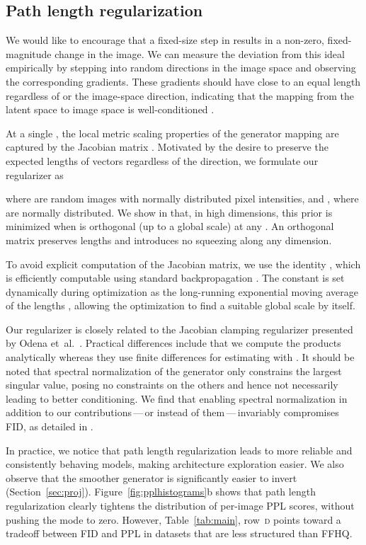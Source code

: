 \documentclass[10pt,twocolumn,letterpaper]{article}
\newcommand{\arch}[1]{\textsc{#1}}
\newcommand{\FINAL}[2][]{#2}
\begin{document}
\subsection{Path length regularization}
\label{sec:pathreg}

 
\FINAL{We would like to encourage that a fixed-size step in  results in a non-zero, fixed-magnitude change in the image. 
We can measure the deviation from this ideal empirically by stepping into random directions in the image space and observing the corresponding  gradients.
These gradients should have close to an equal length regardless of  or the image-space direction, indicating that the mapping from the latent space to image space is well-conditioned \cite{Odena2018}.
}

At a single , the local metric scaling properties of the generator mapping   are captured by the Jacobian matrix . Motivated by the desire to preserve the expected lengths of vectors regardless of the direction, we formulate our regularizer as

where  are random images with normally distributed pixel intensities, and , where  are normally distributed. We show in  that, in high dimensions, this prior is minimized when  is orthogonal (up to a global scale) at any . An orthogonal matrix preserves lengths and introduces no squeezing along any dimension.

To avoid explicit computation of the Jacobian matrix, we use the identity , which is efficiently computable using standard backpropagation \cite{Dauphin2015}. The constant  is set dynamically during optimization as the long-running exponential moving average of the lengths , allowing the optimization to find a suitable global scale by itself.

Our regularizer is closely related to the Jacobian clamping regularizer presented by Odena et~al.~\cite{Odena2018}. Practical differences include that we compute the products  analytically whereas they use finite differences for estimating  with .
It should be noted that spectral normalization \cite{Miyato2018B} of the generator \cite{Zhang2018sagan} only constrains the largest singular value, posing no constraints on the others and hence not necessarily leading to better conditioning.
\FINAL{We find that enabling spectral normalization in addition to our contributions\,---\,or instead of them\,---\,invariably compromises FID, as detailed in \refappspectralnorm{}.}

In practice, we notice that path length regularization leads to more reliable and consistently behaving models, making architecture exploration easier.
\FINAL{We also observe that the smoother generator is significantly easier to invert (Section~\ref{sec:proj}).}
Figure~\ref{fig:pplhistograms}b shows that path length regularization clearly tightens the distribution of per-image PPL \FINAL{scores, without pushing the mode to zero.}
\FINAL{However, Table~\ref{tab:main}, row~\arch{d} points toward a tradeoff between FID and PPL in datasets that are less structured than \textsc{FFHQ}.}
\end{document}

